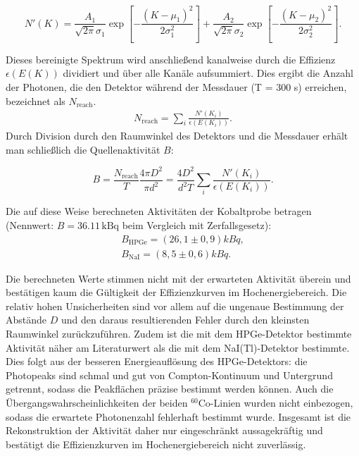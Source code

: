 \[
N'(K) =
\frac{A_1}{\sqrt{2\pi}\sigma_1}
\exp\!\left[-\frac{(K-\mu_1)^2}{2\sigma_1^2}\right]
+
\frac{A_2}{\sqrt{2\pi}\sigma_2}
\exp\!\left[-\frac{(K-\mu_2)^2}{2\sigma_2^2}\right].
\tag{9}
\]

Dieses bereinigte Spektrum wird anschließend kanalweise durch die Effizienz \(\epsilon(E(K))\) dividiert und über alle Kanäle aufsummiert. Dies ergibt die Anzahl der Photonen, die den Detektor während der Messdauer (T = 300 s) erreichen, bezeichnet als \(N_\text{reach}\).
\begin{align*}
    N_\text{reach} = \sum_i \frac{N'(K_i)}{\epsilon(E(K_i))}.
\end{align*}
Durch Division durch den Raumwinkel des Detektors und die Messdauer erhält man schließlich die Quellenaktivität \(B\):

\begin{equation}
    B = \frac{N_\text{reach}}{T} \frac{4\pi D^2}{\pi d^2}
    = \frac{4D^2}{d^2 T}\sum_i \frac{N'(K_i)}{\epsilon(E(K_i))}.   
\end{equation}

Die auf diese Weise berechneten Aktivitäten der Kobaltprobe betragen (Nennwert: \(B = 36.11\,\text{kBq}\) beim Vergleich mit Zerfallsgesetz):
\begin{align*}
    B_{\text{HPGe}} = (26,1 \pm 0,9)kBq,\\
    B_{\text{NaI}} = (8,5 \pm 0,6)kBq.
\end{align*}


Die berechneten Werte stimmen nicht mit der erwarteten Aktivität überein und bestätigen kaum die Gültigkeit der Effizienzkurven im Hochenergiebereich. Die relativ hohen Unsicherheiten sind vor allem auf die ungenaue Bestimmung der Abstände \(D\) und den daraus resultierenden Fehler durch den kleinsten Raumwinkel zurückzuführen. 
Zudem ist die mit dem HPGe-Detektor bestimmte Aktivität näher am Literaturwert als die mit dem NaI(Tl)-Detektor bestimmte. Dies folgt aus der besseren Energieauflösung des HPGe-Detektors: die Photopeaks sind schmal und gut von Compton-Kontinuum und Untergrund getrennt, sodass die Peakflächen präzise bestimmt werden können.
Auch die Übergangswahrscheinlichkeiten der beiden $^{60}\mathrm{Co}$-Linien wurden nicht einbezogen, sodass die erwartete Photonenzahl fehlerhaft bestimmt wurde. Insgesamt ist die Rekonstruktion der Aktivität daher nur eingeschränkt aussagekräftig und bestätigt die Effizienzkurven im Hochenergiebereich nicht zuverlässig.
